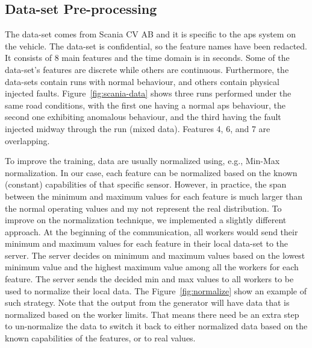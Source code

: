 




\subsection{Data-set Pre-processing}
\label{sec:data-pre-process}
%
 The data-set comes from Scania CV AB and it is specific to the \gls*{aps} system on the vehicle. The data-set is confidential, so the feature names have been redacted. It consists of 8 main features and the time domain is in seconds. Some of the data-set's features are discrete while others are continuous. Furthermore, the data-sets contain runs with normal behaviour, and others contain physical injected faults.
%
Figure~\ref{fig:scania-data} shows three runs performed under the same road conditions, with the first one having a normal \gls*{aps} behaviour, the second one exhibiting anomalous behaviour, and the third having the fault injected midway through the run (mixed data). Features 4, 6, and 7 are overlapping.



To improve the training, data are usually normalized using, e.g., Min-Max normalization. In our case, each feature can be normalized based on the known (constant) capabilities of that specific sensor. %
However, in practice, the span between the minimum and maximum values for each feature is much larger than the normal operating values and my not represent the real distribution.
%
To improve on the normalization technique, we implemented a slightly different approach.
At the beginning of the communication, all workers would send their minimum and maximum values for each feature in their local data-set to the server. The server decides on minimum and maximum values based on the lowest minimum value and the highest maximum value among all the workers for each feature. The server sends the decided min and max values to all workers to be used to normalize their local data. The Figure~\ref{fig:normalize} show an example of such strategy. Note that the output from the generator will have data that is normalized based on the worker limits. That means there need be an extra step to un-normalize the data to switch it back to either normalized data based on the known capabilities of the features, or to real values.
\newcommand\normscale{0.6}



